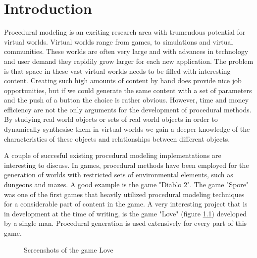 
\chapter{Introduction}
\label{sec:intro}


Procedural modeling is an exciting research area with trumendous potential for virtual worlds. Virtual worlds range from games, to simulations and virtual communities. These worlds are often very large and with advances in technology and user demand they rapidily grow larger for each new application. The problem is that space in these vast virtual worlds needs to be filled with interesting content. Creating such high amounts of content by hand does provide nice job opportunities, but if we could generate the same content with a set of parameters and the push of a button the choice is rather obvious. However, time and money efficiency are not the only arguments for the development of procedural methods. By studying real world objects or sets of real world objects in order to dynamically synthesise them in virtual worlds we gain a deeper knowledge of the characteristics of these objects and relationships between different objects. 

A couple of succesful existing procedural modeling implementations are interesting to discuss. In games, procedural methods have been employed for the generation of worlds with restricted sets of environmental elements, such as dungeons and mazes. A good example is the game "Diablo 2". The game "Spore" was one of the first games that heavily utilized procedural modeling techniques for a considerable part of content in the game. A very interesting project that is in development at the time of writing, is the game "Love" (figure \ref{fig:love}) developed by a single man. Procedural generation is used extensively for every part of this game.
      
\begin{figure}[htb]
\centering
{}

\label{fig:love}
\caption[]{Screenshots of the game Love}
\end{figure}


